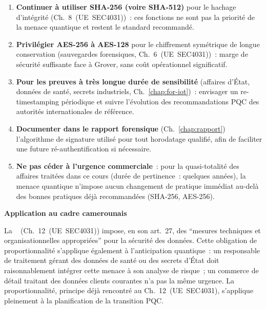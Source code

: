 \begin{enumerate}
    \item \textbf{Continuer à utiliser SHA-256 (voire SHA-512)}
          pour le hachage d'intégrité (Ch.~8~(UE~SEC4031))~:
          ces fonctions ne sont pas la priorité de la menace
          quantique et restent le standard recommandé.
    \item \textbf{Privilégier AES-256 à AES-128} pour le chiffrement
          symétrique de longue conservation (sauvegardes
          forensiques, Ch.~6~(UE~SEC4031))~: marge de sécurité
          suffisante face à Grover, sans coût opérationnel
          significatif.
    \item \textbf{Pour les preuves à très longue durée de
          sensibilité} (affaires d'État, données de santé,
          secrets industriels, Ch.~\ref{chap:for-iot})~: envisager
          un re-timestamping périodique et suivre l'évolution
          des recommandations PQC des autorités internationales
          de référence.
    \item \textbf{Documenter dans le rapport forensique}
          (Ch.~\ref{chap:rapport}) l'algorithme de signature
          utilisé pour tout horodatage qualifié, afin de faciliter
          une future ré-authentification si nécessaire.
    \item \textbf{Ne pas céder à l'urgence commerciale}~: pour
          la quasi-totalité des affaires traitées dans ce cours
          (durée de pertinence~: quelques années), la menace
          quantique n'impose aucun changement de pratique immédiat
          au-delà des bonnes pratiques déjà recommandées
          (SHA-256, AES-256).
\end{enumerate}

\begin{boxjuris}
\textbf{Application au cadre camerounais}

La ~\cite{cameroun2024donnees} (Ch.~12~(UE~SEC4031)) impose, en son
art.~27, des ``mesures techniques et organisationnelles
appropriées'' pour la sécurité des données. Cette obligation
de proportionnalité s'applique également à l'anticipation
quantique~: un responsable de traitement gérant des données de
santé ou des secrets d'État doit raisonnablement intégrer cette
menace à son analyse de risque~; un commerce de détail traitant
des données clients courantes n'a pas la même urgence. La
proportionnalité, principe déjà rencontré au Ch.~12~(UE~SEC4031),
s'applique pleinement à la planification de la transition PQC.
\end{boxjuris}

